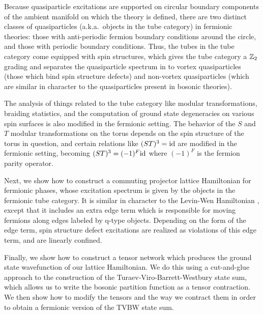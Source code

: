 Because quasiparticle excitations are supported on circular boundary components of the ambient 
manifold on which the theory is defined, there are two distinct classes of quasiparticles (a.k.a.\ objects in the tube category) in 
fermionic theories: those with anti-periodic fermion boundary conditions around the circle, and 
those with periodic boundary conditions. 
Thus, the tubes in the tube category come equipped with spin structures, which gives the tube category a $\mathbb{Z}_2$ grading
and separates the quasiparticle spectrum in to vortex quasiparticles (those which bind spin structure defects) 
and non-vortex quasiparticles (which are similar in character to the quasiparticles present in bosonic theories). 






The analysis of things related to the tube category like modular transformations, braiding statistics, and the computation of ground state degeneracies on various spin surfaces
is also modified in the fermionic setting.  
The behavior of the $S$ and $T$ modular transformations on the torus depends on the spin structure of the torus in question, and 
certain relations like $(ST)^3 = \text{id}$ are modified in the fermionic setting, becoming 
$(ST)^3=(-1)^F\text{id}$ where $(-1)^F$ is the fermion parity operator.

Next,  we show how to construct a commuting projector lattice Hamiltonian 
for fermionic phases, whose excitation spectrum is given by the objects in the fermionic tube category.  
It is similar in character to the Levin-Wen Hamiltonian \cite{levin2005}, 
except that it includes an extra edge term which is responsible for moving fermions along
edges labeled by q-type objects. 
Depending on the form of the edge term, spin structure defect excitations 
are realized as violations of this edge term, and are linearly confined. 

Finally, we show how to construct a tensor network which produces the ground state 
wavefunction of our lattice Hamiltonian. We do this using a cut-and-glue approach to 
the construction of the Turaev-Viro-Barrett-Westbury state sum, which allows us to write the bosonic partition function
as a tensor contraction. We then show how to modify the tensors 
and the way we contract them in order to obtain a fermionic version of the TVBW state sum.  

